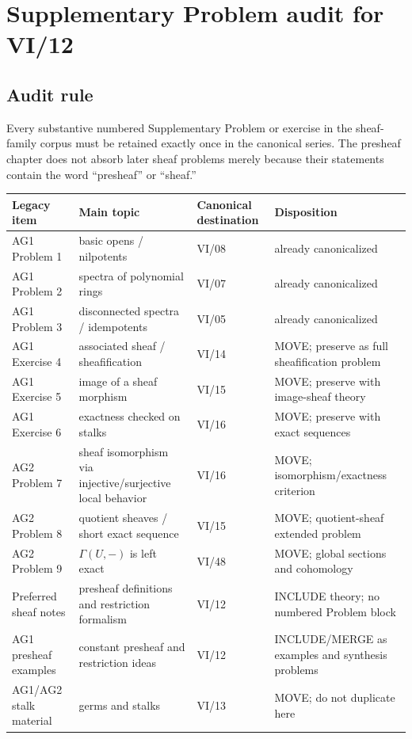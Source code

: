\chapter{Supplementary Problem audit for VI/12}
\label{app:vi12-legacy-audit}

\section*{Audit rule}

Every substantive numbered Supplementary Problem or exercise in the sheaf-family corpus must be
retained exactly once in the canonical series.  The presheaf chapter does not absorb later
sheaf problems merely because their statements contain the word ``presheaf'' or ``sheaf.''

\begin{center}
\small
\renewcommand{\arraystretch}{1.18}
\begin{tabular}{p{}p{}p{}p{}}
\toprule
Legacy item & Main topic & Canonical destination & Disposition\\
\midrule
AG1 Problem 1 & basic opens / nilpotents & VI/08 & already canonicalized\\
AG1 Problem 2 & spectra of polynomial rings & VI/07 & already canonicalized\\
AG1 Problem 3 & disconnected spectra / idempotents & VI/05 & already canonicalized\\
AG1 Exercise 4 & associated sheaf / sheafification & VI/14 & MOVE; preserve as full sheafification problem\\
AG1 Exercise 5 & image of a sheaf morphism & VI/15 & MOVE; preserve with image-sheaf theory\\
AG1 Exercise 6 & exactness checked on stalks & VI/16 & MOVE; preserve with exact sequences\\
AG2 Problem 7 & sheaf isomorphism via injective/surjective local behavior & VI/16 & MOVE; isomorphism/exactness criterion\\
AG2 Problem 8 & quotient sheaves / short exact sequence & VI/15 & MOVE; quotient-sheaf extended problem\\
AG2 Problem 9 & $\Gamma(U,-)$ is left exact & VI/48 & MOVE; global sections and cohomology\\
Preferred sheaf notes & presheaf definitions and restriction formalism & VI/12 & INCLUDE theory; no numbered Problem block\\
AG1 presheaf examples & constant presheaf and restriction ideas & VI/12 & INCLUDE/MERGE as examples and synthesis problems\\
AG1/AG2 stalk material & germs and stalks & VI/13 & MOVE; do not duplicate here\\
\bottomrule
\end{tabular}
\end{center}

